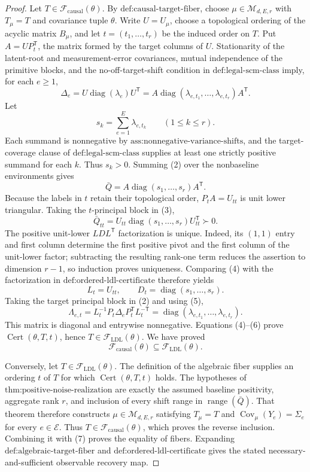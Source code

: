 \documentclass{article}
\begin{document}
\begin{proof}
Let \(T\in\mathcal F_{\mathrm{causal}}(\theta)\).  By \(\text{def:causal-target-fiber}\), choose \(\mu\in\mathcal M_{d,E,r}\) with \(T_\mu=T\) and covariance tuple \(\theta\).  Write \(U=U_\mu\), choose a topological ordering of the acyclic matrix \(B_\mu\), and let \(t=(t_1,\ldots,t_r)\) be the induced order on \(T\).  Put \(A=UP_t^{\mathsf T}\), the matrix formed by the target columns of \(U\).  Stationarity of the latent-root and measurement-error covariances, mutual independence of the primitive blocks, and the no-off-target-shift condition in \(\text{def:legal-scm-class}\) imply, for each \(e\ge1\),
\[
 \Delta_e
 =U\operatorname{diag}(\lambda_e)U^{\mathsf T}
 =A\operatorname{diag}(\lambda_{e,t_1},\ldots,\lambda_{e,t_r})A^{\mathsf T}. \tag{2}
\]
Let
\[
 s_k=\sum_{e=1}^E\lambda_{e,t_k}\qquad(1\le k\le r).
\]
Each summand is nonnegative by \(\text{ass:nonnegative-variance-shifts}\), and the target-coverage clause of \(\text{def:legal-scm-class}\) supplies at least one strictly positive summand for each \(k\).  Thus \(s_k>0\).  Summing (2) over the nonbaseline environments gives
\[
 \bar Q=A\operatorname{diag}(s_1,\ldots,s_r)A^{\mathsf T}. \tag{3}
\]
Because the labels in \(t\) retain their topological order, \(P_tA=U_{tt}\) is unit lower triangular.  Taking the \(t\)-principal block in (3),
\[
 \bar Q_{tt}=U_{tt}\operatorname{diag}(s_1,\ldots,s_r)U_{tt}^{\mathsf T}\succ0. \tag{4}
\]
The positive unit-lower \(LDL^{\mathsf T}\) factorization is unique.  Indeed, its \((1,1)\) entry and first column determine the first positive pivot and the first column of the unit-lower factor; subtracting the resulting rank-one term reduces the assertion to dimension \(r-1\), so induction proves uniqueness.  Comparing (4) with the factorization in \(\text{def:ordered-ldl-certificate}\) therefore yields
\[
 L_t=U_{tt},\qquad D_t=\operatorname{diag}(s_1,\ldots,s_r). \tag{5}
\]
Taking the target principal block in (2) and using (5),
\[
 \Lambda_{e,t}
 =L_t^{-1}P_t\Delta_eP_t^{\mathsf T}L_t^{-\mathsf T}
 =\operatorname{diag}(\lambda_{e,t_1},\ldots,\lambda_{e,t_r}). \tag{6}
\]
This matrix is diagonal and entrywise nonnegative.  Equations (4)--(6) prove \(\operatorname{Cert}(\theta,T,t)\), hence \(T\in\mathcal F_{\mathrm{LDL}}(\theta)\).  We have proved
\[
 \mathcal F_{\mathrm{causal}}(\theta)\subseteq\mathcal F_{\mathrm{LDL}}(\theta). \tag{7}
\]

Conversely, let \(T\in\mathcal F_{\mathrm{LDL}}(\theta)\).  The definition of the algebraic fiber supplies an ordering \(t\) of \(T\) for which \(\operatorname{Cert}(\theta,T,t)\) holds.  The hypotheses of \(\text{thm:positive-noise-realization}\) are exactly the assumed baseline positivity, aggregate rank \(r\), and inclusion of every shift range in \(\operatorname{range}(\bar Q)\).  That theorem therefore constructs \(\mu\in\mathcal M_{d,E,r}\) satisfying \(T_\mu=T\) and \(\operatorname{Cov}_\mu(Y_e)=\Sigma_e\) for every \(e\in\mathcal E\).  Thus \(T\in\mathcal F_{\mathrm{causal}}(\theta)\), which proves the reverse inclusion.  Combining it with (7) proves the equality of fibers.  Expanding \(\text{def:algebraic-target-fiber}\) and \(\text{def:ordered-ldl-certificate}\) gives the stated necessary-and-sufficient observable recovery map.
\end{proof}
\end{document}
